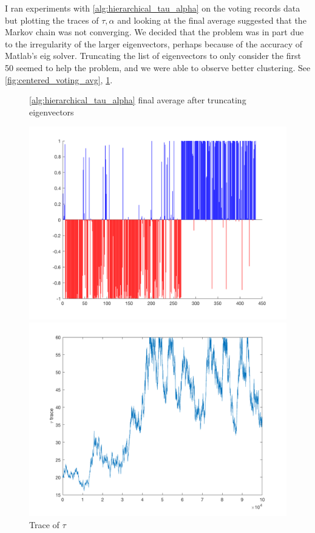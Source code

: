 \documentclass{siamart1116}
\begin{document}
I ran experiments with \cref{alg:hierarchical_tau_alpha} on the voting records data but plotting the traces of $\tau, \alpha$ and looking at the final average suggested that the Markov chain was not converging. We decided that the problem was in part due to the irregularity of the larger eigenvectors, perhaps because of the accuracy of Matlab's eig solver. Truncating the list of eigenvectors to only consider the first 50 seemed to help the problem, and we were able to observe better clustering. See \cref{fig:centered_voting_avg}, \cref{fig:centered_voting_tau}.

\begin{figure}[H]
\begin{minipage}{0.48\textwidth}
    \caption{\label{fig:centered_voting_avg} \cref{alg:hierarchical_tau_alpha} final average after truncating eigenvectors}
    \includegraphics[width=\linewidth]{centered/final_avg.png}
\end{minipage}\hfill
\begin{minipage}{0.48\textwidth}
    \caption{\label{fig:centered_voting_tau} Trace of $\tau$}
    \includegraphics[width=\linewidth]{centered/trace_tau.png}
\end{minipage}
\end{figure}
\end{document}

